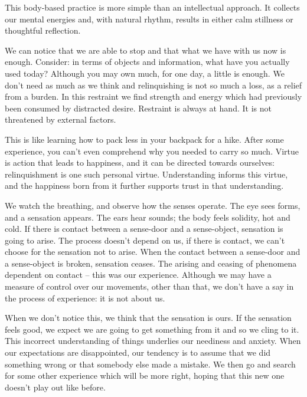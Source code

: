 This body-based practice is more simple than an intellectual approach.
It collects our mental energies and, with natural rhythm, results in
either calm stillness or thoughtful reflection.

We can notice that we are able to stop and that what we have with us now
is enough. Consider: in terms of objects and information, what have you
actually used today? Although you may own much, for one day, a little is
enough. We don't need as much as we think and relinquishing is not so
much a loss, as a relief from a burden. In this restraint we find
strength and energy which had previously been consumed by distracted
desire. Restraint is always at hand. It is not threatened by external
factors.

This is like learning how to pack less in your backpack for a hike.
After some experience, you can't even comprehend why you needed to carry
so much. Virtue is action that leads to happiness, and it can be
directed towards ourselves: relinquishment is one such personal virtue.
Understanding informs this virtue, and the happiness born from it
further supports trust in that understanding.

\clearpage


We watch the breathing, and observe how the senses operate. The eye sees
forms, and a sensation appears. The ears hear sounds; the body feels
solidity, hot and cold. If there is contact between a sense-door and a
sense-object, sensation is going to arise. The process doesn't depend on
us, if there is contact, we can't choose for the sensation not to arise.
When the contact between a sense-door and a sense-object is broken,
sensation ceases. The arising and ceasing of phenomena dependent on
contact -- this was our experience. Although we may have a measure of
control over our movements, other than that, we don't have a say in the
process of experience: it is not about us.

When we don't notice this, we think that the sensation is ours. If the
sensation feels good, we expect we are going to get something from it
and so we cling to it. This incorrect understanding of things underlies
our neediness and anxiety. When our expectations are disappointed, our
tendency is to assume that we did something wrong or that somebody else
made a mistake. We then go and search for some other experience which
will be more right, hoping that this new one doesn't play out like
before.


